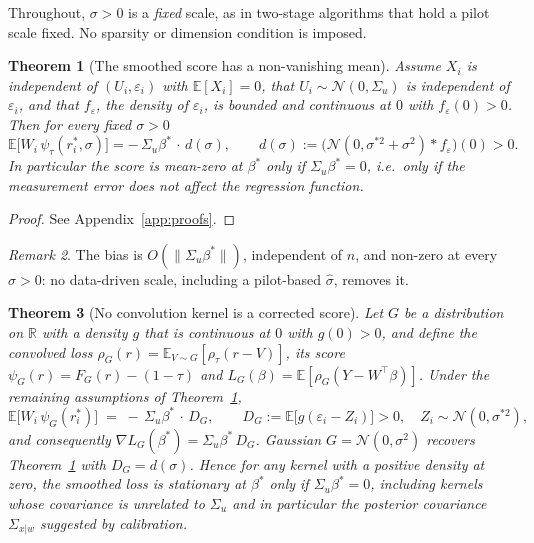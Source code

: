 \documentclass[12pt,a4paper]{article}
\newtheorem{theorem}{Theorem}[section]
\theoremstyle{definition}
\theoremstyle{remark}
\newtheorem{remark}[theorem]{Remark}
\newcommand{\R}{\mathbb{R}}
\newcommand{\E}{\mathbb{E}}
\newcommand{\cN}{\mathcal{N}}
\newcommand{\psit}{\psi_\tau}
\newcommand{\betas}{\beta^*}
\newcommand{\sigmah}{\hat{\sigma}}
\newcommand{\Sxw}{\Sigma_{x|w}}
\begin{document}
Throughout, $\sigma>0$ is a \emph{fixed} scale, as in two-stage algorithms that hold a pilot
scale fixed. No sparsity or dimension condition is imposed.

\begin{theorem}[The smoothed score has a non-vanishing mean]
\label{thm:score}
Assume $X_i$ is independent of $(U_i,\varepsilon_i)$ with $\E[X_i]=0$, that
$U_i\sim\cN(0,\Sigma_u)$ is independent of $\varepsilon_i$, and that
$f_\varepsilon$, the density of $\varepsilon_i$, is bounded and continuous at $0$ with
$f_\varepsilon(0)>0$. Then for every fixed $\sigma>0$
\begin{equation}
\E\big[W_i\,\psit(r_i^*,\sigma)\big] = -\,\Sigma_u\betas \,\cdot\, d(\sigma),
\qquad
d(\sigma) := \big(\cN(0,\sigma^{*2}+\sigma^2)*f_\varepsilon\big)(0) > 0 .
\label{eq:score-bias}
\end{equation}
In particular the score is mean-zero at $\betas$ only if $\Sigma_u\betas = 0$, i.e.\ only
if the measurement error does not affect the regression function.
\end{theorem}

\begin{proof}
See Appendix~\ref{app:proofs}.
\end{proof}

\begin{remark}
The bias is $O(\|\Sigma_u\betas\|)$, independent of $n$, and non-zero at every $\sigma>0$:
no data-driven scale, including a pilot-based $\sigmah$, removes it.
\end{remark}

\begin{theorem}[No convolution kernel is a corrected score]
\label{thm:kernel-class}
Let $G$ be a distribution on $\R$ with a density $g$ that is continuous at $0$ with
$g(0)>0$, and define the convolved loss
$\rho_G(r) = \E_{V\sim G}[\rho_\tau(r-V)]$, its score
$\psi_G(r) = F_G(r)-(1-\tau)$ and $L_G(\beta) = \E[\rho_G(Y-W^\top\beta)]$. Under the
remaining assumptions of Theorem~\ref{thm:score},
\begin{equation}
\E\big[W_i\,\psi_G(r_i^*)\big] \;=\; -\,\Sigma_u\betas\,\cdot\,D_G,
\qquad
D_G := \E\big[g(\varepsilon_i-Z_i)\big] > 0,
\quad Z_i\sim\cN(0,\sigma^{*2}) ,
\label{eq:kernel-bias}
\end{equation}
and consequently $\nabla L_G(\betas) = \Sigma_u\betas\,D_G$. Gaussian $G=\cN(0,\sigma^2)$
recovers Theorem~\ref{thm:score} with $D_G = d(\sigma)$. Hence for \emph{any} kernel with
a positive density at zero, the smoothed loss is stationary at $\betas$ only if
$\Sigma_u\betas=0$, including kernels whose covariance is unrelated to $\Sigma_u$ and in
particular the posterior covariance $\Sxw$ suggested by calibration.
\end{theorem}
\end{document}

